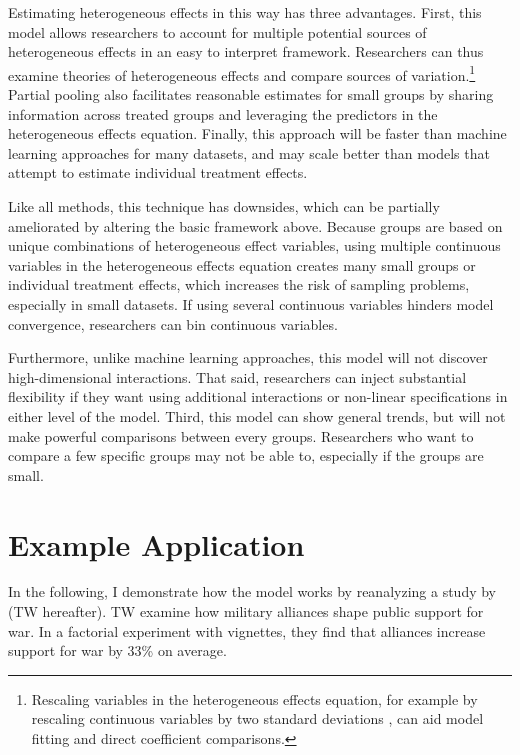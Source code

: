\documentclass[12pt]{article}
\begin{document}
Estimating heterogeneous effects in this way has three advantages.
First, this model allows researchers to account for multiple potential sources of heterogeneous effects in an easy to interpret framework. 
Researchers can thus examine theories of heterogeneous effects and compare sources of variation.\footnote{Rescaling variables in the heterogeneous effects equation, for example by rescaling continuous variables by two standard deviations \citep{Gelman2008}, can aid model fitting and direct coefficient comparisons.} 
Partial pooling also facilitates reasonable estimates for small groups by sharing information across treated groups and leveraging the predictors in the heterogeneous effects equation. 
Finally, this approach will be faster than machine learning approaches for many datasets, and may scale better than models that attempt to estimate individual treatment effects.


Like all methods, this technique has downsides, which can be partially ameliorated by altering the basic framework above. 
Because groups are based on unique combinations of heterogeneous effect variables, using multiple continuous variables in the heterogeneous effects equation creates many small groups or individual treatment effects, which increases the risk of sampling problems, especially in small datasets. 
If using several continuous variables hinders model convergence, researchers can bin continuous variables.


Furthermore, unlike machine learning approaches, this model will not discover high-dimensional interactions. 
That said, researchers can inject substantial flexibility if they want using additional interactions or non-linear specifications in either level of the model. 
Third, this model can show general trends, but will not make powerful comparisons between every groups. 
Researchers who want to compare a few specific groups may not be able to, especially if the groups are small.



\section{Example Application} 


In the following, I demonstrate how the model works by reanalyzing a study by \citet{TomzWeeks2021} (TW hereafter). 
TW examine how military alliances shape public support for war.
In a factorial experiment with vignettes, they find that alliances increase support for war by 33\% on average. 
\end{document}
